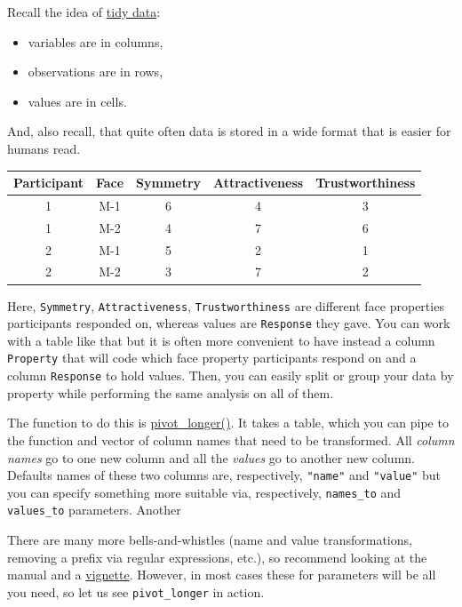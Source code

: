 \documentclass[
]{book}
\providecommand{\tightlist}{%
  \setlength{\itemsep}{0pt}\setlength{\parskip}{0pt}}
\begin{document}
Recall the idea of \protect\hyperlink{tidydata}{tidy data}:

\begin{itemize}
\tightlist
\item
  variables are in columns,
\item
  observations are in rows,
\item
  values are in cells.
\end{itemize}

And, also recall, that quite often data is stored in a wide format that is easier for humans read.

\begin{tabular}{c|c|c|c|c}
\hline
Participant & Face & Symmetry & Attractiveness & Trustworthiness\\
\hline
1 & M-1 & 6 & 4 & 3\\
\hline
1 & M-2 & 4 & 7 & 6\\
\hline
2 & M-1 & 5 & 2 & 1\\
\hline
2 & M-2 & 3 & 7 & 2\\
\hline
\end{tabular}

Here, \texttt{Symmetry}, \texttt{Attractiveness}, \texttt{Trustworthiness} are different face properties participants responded on, whereas values are \texttt{Response} they gave. You can work with a table like that but it is often more convenient to have instead a column \texttt{Property} that will code which face property participants respond on and a column \texttt{Response} to hold values. Then, you can easily split or group your data by property while performing the same analysis on all of them.

The function to do this is \href{https://tidyr.tidyverse.org/reference/pivot_longer.html}{pivot\_longer()}. It takes a table, which you can pipe to the function and vector of column names that need to be transformed. All \emph{column names} go to one new column and all the \emph{values} go to another new column. Defaults names of these two columns are, respectively, \texttt{"name"} and \texttt{"value"} but you can specify something more suitable via, respectively, \texttt{names\_to} and \texttt{values\_to} parameters. Another

There are many more bells-and-whistles (name and value transformations, removing a prefix via regular expressions, etc.), so recommend looking at the manual and a \href{https://tidyr.tidyverse.org/articles/pivot.html}{vignette}. However, in most cases these for parameters will be all you need, so let us see \texttt{pivot\_longer} in action.
\end{document}

